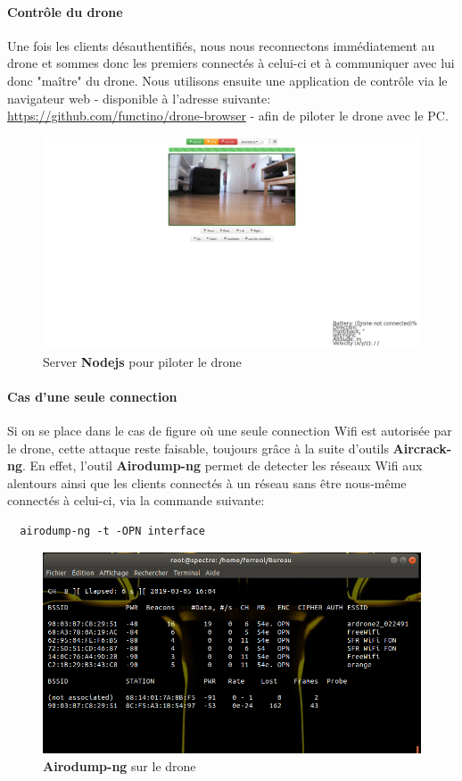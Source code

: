 \paragraph{Contrôle du drone}
Une fois les clients désauthentifiés, nous nous reconnectons immédiatement au drone et sommes donc les premiers connectés à celui-ci et à communiquer avec lui donc "maître" du drone. Nous utilisons ensuite une application de contrôle via le navigateur web \cite{ref5} - disponible à l'adresse suivante: \url{https://github.com/functino/drone-browser} - afin de piloter le drone avec le PC.

\begin{figure}[H]
  \centering
  \includegraphics[scale=0.3]{images/drone_browser}
  \caption{Server \textbf{Nodejs} pour piloter le drone}
\end{figure}

\paragraph{Cas d'une seule connection}
Si on se place dans le cas de figure où une seule connection Wifi est autorisée par le drone, cette attaque reste faisable, toujours grâce à la suite d'outils \textbf{Aircrack-ng}. En effet, l'outil \textbf{Airodump-ng} permet de detecter les réseaux Wifi aux alentours ainsi que les clients connectés à un réseau sans être nous-même connectés à celui-ci, via la commande suivante:
\begin{verbatim}
  airodump-ng -t -OPN interface
\end{verbatim}

\begin{figure}[H]
  \centering
  \includegraphics[scale=0.5]{images/airodump}
  \caption{\textbf{Airodump-ng} sur le drone}
\end{figure}

